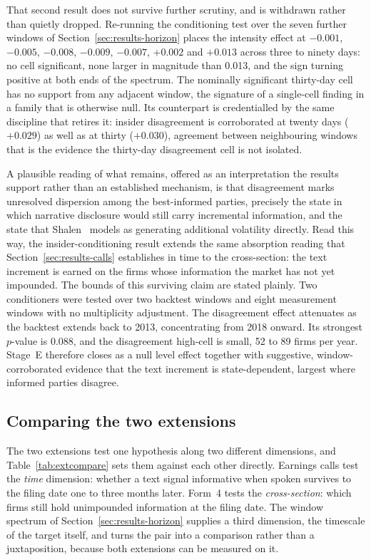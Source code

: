 \documentclass[logo,msc,ai]{infthesis}        %
\begin{document}
That second result does not survive further scrutiny, and is withdrawn rather than quietly dropped. Re-running the conditioning test over the seven further windows of Section~\ref{sec:results-horizon} places the intensity effect at $-0.001$, $-0.005$, $-0.008$, $-0.009$, $-0.007$, $+0.002$ and $+0.013$ across three to ninety days: no cell significant, none larger in magnitude than 0.013, and the sign turning positive at both ends of the spectrum. The nominally significant thirty-day cell has no support from any adjacent window, the signature of a single-cell finding in a family that is otherwise null. Its counterpart is credentialled by the same discipline that retires it: insider disagreement is corroborated at twenty days ($+0.029$) as well as at thirty ($+0.030$), agreement between neighbouring windows that is the evidence the thirty-day disagreement cell is not isolated.

A plausible reading of what remains, offered as an interpretation the results support rather than an established mechanism, is that disagreement marks unresolved dispersion among the best-informed parties, precisely the state in which narrative disclosure would still carry incremental information, and the state that Shalen~\cite{shalen1993volume} models as generating additional volatility directly. Read this way, the insider-conditioning result extends the same absorption reading that Section~\ref{sec:results-calls} establishes in time to the cross-section: the text increment is earned on the firms whose information the market has not yet impounded. The bounds of this surviving claim are stated plainly. Two conditioners were tested over two backtest windows and eight measurement windows with no multiplicity adjustment. The disagreement effect attenuates as the backtest extends back to 2013, concentrating from 2018 onward. Its strongest $p$-value is 0.088, and the disagreement high-cell is small, 52 to 89 firms per year. Stage~E therefore closes as a null level effect together with suggestive, window-corroborated evidence that the text increment is state-dependent, largest where informed parties disagree.

\subsection{Comparing the two extensions}
The two extensions test one hypothesis along two different dimensions, and Table~\ref{tab:extcompare} sets them against each other directly. Earnings calls test the \emph{time} dimension: whether a text signal informative when spoken survives to the filing date one to three months later. Form~4 tests the \emph{cross-section}: which firms still hold unimpounded information at the filing date. The window spectrum of Section~\ref{sec:results-horizon} supplies a third dimension, the timescale of the target itself, and turns the pair into a comparison rather than a juxtaposition, because both extensions can be measured on it.
\end{document}

